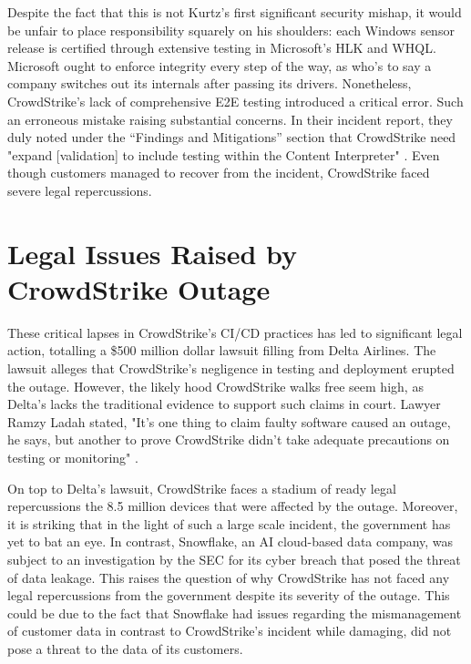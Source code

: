 Despite the fact that this is not Kurtz's first significant security mishap, it would be unfair to place responsibility squarely on his shoulders:
each Windows sensor release is certified through extensive testing in Microsoft's HLK and WHQL. Microsoft ought to enforce
integrity every step of the way, as who's to say a company switches out its internals after passing its drivers. Nonetheless, CrowdStrike's
lack of comprehensive E2E testing introduced a critical error. Such an erroneous mistake raising substantial concerns.
In their incident report, they duly noted under the ``Findings and Mitigations'' section that CrowdStrike need
"expand [validation] to include testing within the Content Interpreter" \cite{crowdstrikechannelfile291rca}.
Even though customers managed to recover from the incident, CrowdStrike faced severe legal repercussions.

\section{Legal Issues Raised by CrowdStrike Outage}
These critical lapses in CrowdStrike's CI/CD practices has led to significant legal action, totalling a \$500 million dollar lawsuit
filling from Delta Airlines. 
The lawsuit alleges that CrowdStrike's negligence in testing and deployment erupted the outage.
However, the likely hood CrowdStrike walks free seem high, as Delta's lacks the traditional evidence to support such claims in court. Lawyer Ramzy Ladah stated,
"It's one thing to claim faulty software caused an outage, he says, but another to prove CrowdStrike didn't take adequate precautions on testing or monitoring"
\cite{delta_lose}.


On top to Delta's lawsuit, CrowdStrike faces a stadium of ready legal repercussions the 8.5 million devices that were affected by the outage. 
Moreover, it is striking that in the light of such a large scale incident, the government has yet to bat an eye. In contrast, Snowflake, an AI cloud-based data company,
was subject to an investigation by the SEC for its cyber breach that posed the threat of data leakage. \cite{snowflake_sec} This raises the question of why CrowdStrike has not faced any legal repercussions from the government despite
its severity of the outage. This could be due to the fact that Snowflake had issues regarding the mismanagement of customer data in contrast to CrowdStrike's incident while damaging,
did not pose a threat to the data of its customers.


